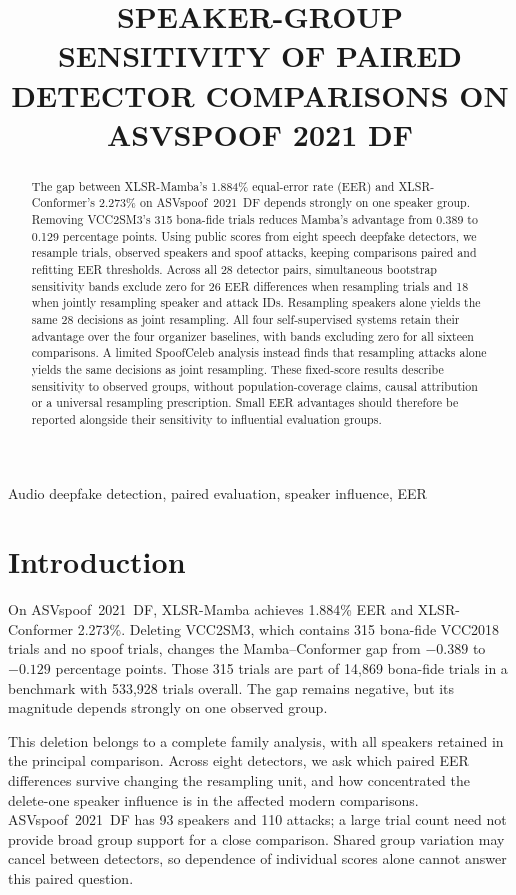\documentclass{article}
\title{SPEAKER-GROUP SENSITIVITY OF PAIRED DETECTOR COMPARISONS ON ASVSPOOF 2021 DF}
\renewcommand{\small}{\fontsize{9.1pt}{10.5pt}\selectfont}
\begin{document}
\maketitle

\begin{abstract}\small
The gap between XLSR-Mamba's 1.884\% equal-error rate (EER) and XLSR-Conformer's 2.273\% on ASVspoof~2021~DF depends strongly on one speaker group. Removing VCC2SM3's 315 bona-fide trials reduces Mamba's advantage from 0.389 to 0.129 percentage points. Using public scores from eight speech deepfake detectors, we resample trials, observed speakers and spoof attacks, keeping comparisons paired and refitting EER thresholds. Across all 28 detector pairs, simultaneous bootstrap sensitivity bands exclude zero for 26 EER differences when resampling trials and 18 when jointly resampling speaker and attack IDs. Resampling speakers alone yields the same 28 decisions as joint resampling. All four self-supervised systems retain their advantage over the four organizer baselines, with bands excluding zero for all sixteen comparisons. A limited SpoofCeleb analysis instead finds that resampling attacks alone yields the same decisions as joint resampling. These fixed-score results describe sensitivity to observed groups, without population-coverage claims, causal attribution or a universal resampling prescription. Small EER advantages should therefore be reported alongside their sensitivity to influential evaluation groups.
\end{abstract}
\begin{keywords}
Audio deepfake detection, paired evaluation, speaker influence, EER
\end{keywords}

\section{Introduction}
\label{sec:intro}
On ASVspoof~2021~DF, XLSR-Mamba achieves 1.884\% EER and XLSR-Conformer 2.273\%. Deleting VCC2SM3, which contains 315 bona-fide VCC2018 trials and no spoof trials, changes the Mamba--Conformer gap from $-0.389$ to $-0.129$ percentage points. Those 315 trials are part of 14,869 bona-fide trials in a benchmark with 533,928 trials overall. The gap remains negative, but its magnitude depends strongly on one observed group.

This deletion belongs to a complete family analysis, with all speakers retained in the principal comparison. Across eight detectors, we ask which paired EER differences survive changing the resampling unit, and how concentrated the delete-one speaker influence is in the affected modern comparisons. ASVspoof~2021~DF has 93 speakers and 110 attacks; a large trial count need not provide broad group support for a close comparison. Shared group variation may cancel between detectors, so dependence of individual scores alone cannot answer this paired question.
\end{document}
